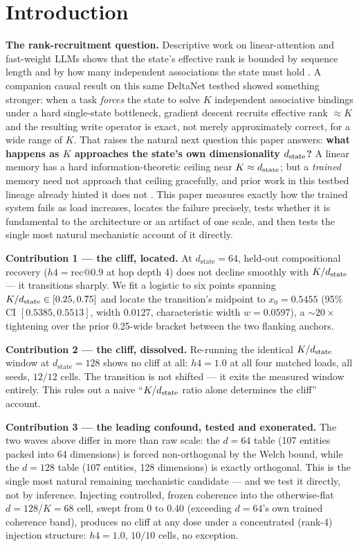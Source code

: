\section{Introduction}
\label{sec:intro}

\textbf{The rank-recruitment question.} Descriptive work on linear-attention
and fast-weight LLMs shows that the state's effective rank is bounded by
sequence length and by how many independent associations the state must
hold \citep{nazari2026rank, sun2026staterank}. A companion causal result on
this same DeltaNet testbed \citep{schlag2021linear} showed something
stronger: when a task \emph{forces} the state to solve $K$ independent
associative bindings under a hard single-state bottleneck, gradient descent
recruits effective rank $\approx K$ and the resulting write operator is
exact, not merely approximately correct, for a wide range of $K$. That raises
the natural next question this paper answers: \textbf{what happens as $K$
approaches the state's own dimensionality $d_{\mathrm{state}}$?} A linear memory has a
hard information-theoretic ceiling near $K \approx d_{\mathrm{state}}$; but a
\emph{trained} memory need not approach that ceiling gracefully, and prior
work in this testbed lineage already hinted it does not
\citep{barnfield2026sharp}. This paper measures exactly how the trained
system fails as load increases, locates the failure precisely, tests whether
it is fundamental to the architecture or an artifact of one scale, and then
tests the single most natural mechanistic account of it directly.

\textbf{Contribution 1 --- the cliff, located.} At $d_{\mathrm{state}}=64$,
held-out compositional recovery ($h4 = \mathrm{rec@0.9}$ at hop depth 4) does
not decline smoothly with $K/d_{\mathrm{state}}$ --- it transitions sharply. We fit a
logistic to six points spanning $K/d_{\mathrm{state}} \in [0.25, 0.75]$ and locate the
transition's midpoint to $x_0 = 0.5455$ (95\% CI $[0.5385, 0.5513]$, width
$0.0127$, characteristic width $w=0.0597$), a $\sim\!20\times$ tightening
over the prior 0.25-wide bracket between the two flanking anchors.

\textbf{Contribution 2 --- the cliff, dissolved.} Re-running the identical
$K/d_{\mathrm{state}}$ window at $d_{\mathrm{state}}=128$ shows no cliff at all:
$h4=1.0$ at all four matched loads, all seeds, $12/12$ cells. The transition
is not shifted --- it exits the measured window entirely. This rules out a
naive ``$K/d_{\mathrm{state}}$ ratio alone determines the cliff'' account.

\textbf{Contribution 3 --- the leading confound, tested and exonerated.}
The two waves above differ in more than raw scale: the $d=64$ table (107
entities packed into 64 dimensions) is forced non-orthogonal by the Welch
bound, while the $d=128$ table (107 entities, 128 dimensions) is exactly
orthogonal. This is the single most natural remaining mechanistic
candidate --- and we test it directly, not by inference. Injecting
controlled, frozen coherence into the otherwise-flat $d=128$/$K=68$ cell,
swept from $0$ to $0.40$ (exceeding $d=64$'s own trained coherence band),
produces no cliff at any dose under a concentrated (rank-4) injection
structure: $h4=1.0$, $10/10$ cells, no exception.

